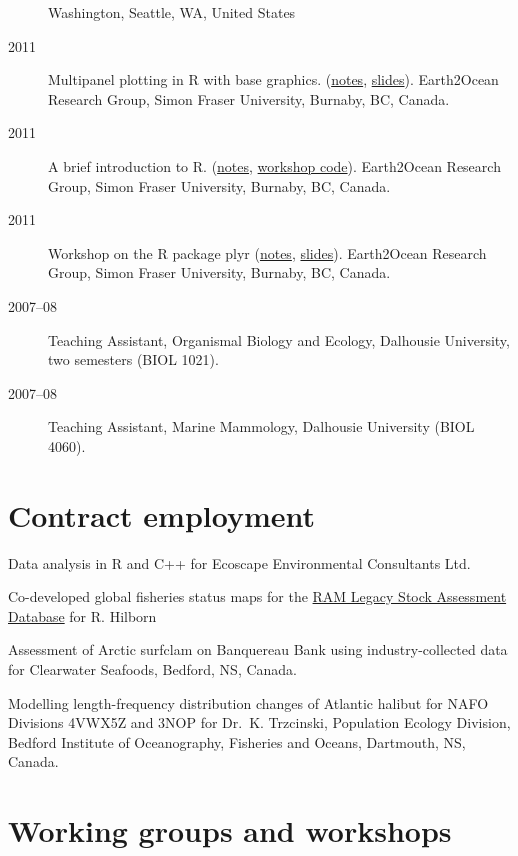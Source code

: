 \begin{description}
Washington, Seattle, WA, United States
\item[2011]
Multipanel plotting in R with base graphics.
(\href{http://seananderson.ca/courses/11-multipanel/multipanel.pdf}{notes},
\href{http://seananderson.ca/courses/11-multipanel/multipanel-slides.pdf}{slides}).
Earth2Ocean Research Group, Simon Fraser University, Burnaby, BC,
Canada.
\item[2011]
A brief introduction to R.
(\href{http://seananderson.ca/courses/11-rintro/RIntro.pdf}{notes},
\href{http://seananderson.ca/courses/11-rintro/RIntro.R}{workshop
code}). Earth2Ocean Research Group, Simon Fraser University, Burnaby,
BC, Canada.
\item[2011]
Workshop on the R package plyr
(\href{http://seananderson.ca/courses/11-plyr/plyr.pdf}{notes},
\href{http://seananderson.ca/courses/11-plyr/plyr-slides.pdf}{slides}).
Earth2Ocean Research Group, Simon Fraser University, Burnaby, BC,
Canada.
\item[2007--08]
Teaching Assistant, Organismal Biology and Ecology, Dalhousie
University, two semesters (BIOL 1021).
\item[2007--08]
Teaching Assistant, Marine Mammology, Dalhousie University (BIOL 4060).
\end{description}

\section{Contract employment}\label{contract-employment}

\begin{description}
\tightlist
\item[2014--15]
Data analysis in R and C++ for Ecoscape Environmental Consultants Ltd.
\item[2013]
Co-developed global fisheries status maps for the
\href{http://ramlegacy.org/}{RAM Legacy Stock Assessment Database} for
R. Hilborn
\item[2010]
Assessment of Arctic surfclam on Banquereau Bank using
industry-collected data for Clearwater Seafoods, Bedford, NS, Canada.
\item[2010]
Modelling length-frequency distribution changes of Atlantic halibut for
NAFO Divisions 4VWX5Z and 3NOP for Dr.\ K. Trzcinski, Population Ecology
Division, Bedford Institute of Oceanography, Fisheries and Oceans,
Dartmouth, NS, Canada.
\end{description}

\section{Working groups and
workshops}\label{working-groups-and-workshops}

